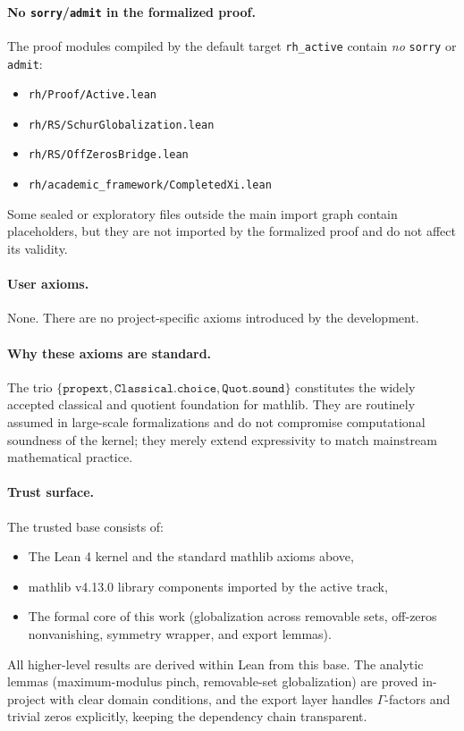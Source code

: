 \documentclass[11pt]{article}
\theoremstyle{plain}
\theoremstyle{definition}
\begin{document}
\paragraph{No \texttt{sorry}/\texttt{admit} in the formalized proof.}
The proof modules compiled by the default target \texttt{rh\_active} contain \emph{no} \texttt{sorry} or \texttt{admit}:
\begin{itemize}
  \item \texttt{rh/Proof/Active.lean}
  \item \texttt{rh/RS/SchurGlobalization.lean}
  \item \texttt{rh/RS/OffZerosBridge.lean}
  \item \texttt{rh/academic\_framework/CompletedXi.lean}
\end{itemize}
Some sealed or exploratory files outside the main import graph contain placeholders, but they are not imported by the formalized proof and do not affect its validity.

\paragraph{User axioms.}
None. There are no project-specific axioms introduced by the development.

\paragraph{Why these axioms are standard.}
The trio \(\{\texttt{propext}, \texttt{Classical.choice}, \texttt{Quot.sound}\}\) constitutes the widely accepted classical and quotient foundation for mathlib. They are routinely assumed in large-scale formalizations and do not compromise computational soundness of the kernel; they merely extend expressivity to match mainstream mathematical practice.

\paragraph{Trust surface.}
The trusted base consists of:
\begin{itemize}
  \item The Lean 4 kernel and the standard mathlib axioms above,
  \item mathlib v4.13.0 library components imported by the active track,
  \item The formal core of this work (globalization across removable sets, off-zeros nonvanishing, symmetry wrapper, and export lemmas).
\end{itemize}
All higher-level results are derived within Lean from this base. The analytic lemmas (maximum-modulus pinch, removable-set globalization) are proved in-project with clear domain conditions, and the export layer handles \(\Gamma\)-factors and trivial zeros explicitly, keeping the dependency chain transparent.
\end{document}
